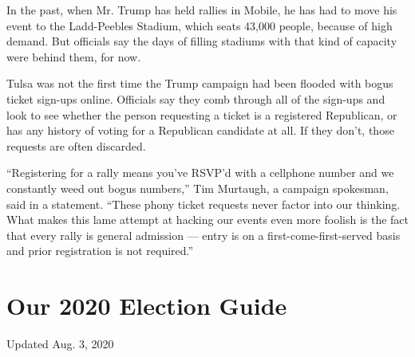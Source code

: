In the past, when Mr. Trump has held rallies in Mobile, he has had to
move his event to the Ladd-Peebles Stadium, which seats 43,000 people,
because of high demand. But officials say the days of filling stadiums
with that kind of capacity were behind them, for now.

Tulsa was not the first time the Trump campaign had been flooded with
bogus ticket sign-ups online. Officials say they comb through all of the
sign-ups and look to see whether the person requesting a ticket is a
registered Republican, or has any history of voting for a Republican
candidate at all. If they don't, those requests are often discarded.

``Registering for a rally means you've RSVP'd with a cellphone number
and we constantly weed out bogus numbers,'' Tim Murtaugh, a campaign
spokesman, said in a statement. ``These phony ticket requests never
factor into our thinking. What makes this lame attempt at hacking our
events even more foolish is the fact that every rally is general
admission --- entry is on a first-come-first-served basis and prior
registration is not required.''

\hypertarget{our-2020-election-guide}{%
\section{Our 2020 Election Guide}\label{our-2020-election-guide}}

Updated Aug. 3, 2020

